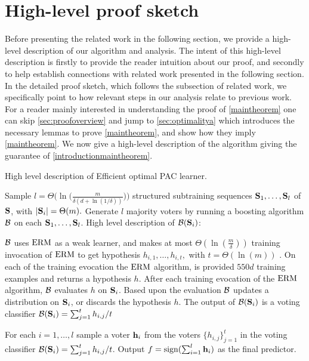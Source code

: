 
\section{High-level proof sketch}
Before presenting the related work in the following section, we provide a high-level description of our algorithm and analysis. The intent of this high-level description is firstly to provide the reader intuition about our proof, and secondly to help establish connections with related work presented in the following section. In the detailed proof sketch, which follows the subsection of related work, we specifically point to how relevant steps in our analysis relate to previous work. For a reader mainly interested in understanding the proof of \cref{maintheorem} one can skip \cref{sec:proofoverview} and jump to \cref{sec:optimalitya} which introduces the necessary lemmas to prove \cref{maintheorem}, and show how they imply \cref{maintheorem}. We now give a high-level description of the algorithm giving the guarantee of \cref{introductionmaintheorem}.

\begin{algorithm}
\caption{High level description of Efficient optimal PAC learner.}\label{alg:algorithmhighlevel}
\begin{algorithmic}[1]
\State Sample $l=\Theta\big(\ln\big(\tfrac{m}{\delta\left(d+\ln{\left(1/\delta \right)}\right)}\big)\big)$ structured subtraining sequences $\mathbf{S}_1, \ldots, \mathbf{S}_{l}$ of $ \mathbf{S} $, with  $ |\mathbf{S}_{i}| =\Theta(m).$ \label{alg:highlevel1}
\State Generate $ l $  majority voters by running a boosting algorithm $\mathcal{B}$ on each $\mathbf{S}_{1},\ldots,\mathbf{S}_{l}$. \quad \quad \quad \quad High level description of $ \mathcal{B}(\mathbf{S}_{i}) $:\label{alg:highlevel2}
\begin{algorithmic}[1]
    \State$ \mathcal{B} $ uses $\mathrm{ERM}$ as a weak learner, and makes at most $\Theta(\ln{\left(\tfrac{m}{\delta} \right)} )$ training invocation of $ \mathrm{ERM} $ to get hypothesis $ h_{i,1},\ldots,h_{i,t},$ with $ t=\Theta(\ln{\left( m\right)}) $ .
    \State On each of the training evocation the $ \mathrm{ERM} $ algorithm, is provided $550d$ training examples and returns a hypothesis $ h $. After each training evocation of the $ \mathrm{ERM} $ algorithm, $ \mathcal{B} $ evaluates $ h$ on $ \mathbf{S}_{i} $. Based upon the evaluation $ \mathcal{B} $  updates a distribution on $ \mathbf{S}_{i}$, or discards the hypothesis $ h.$     
    \State The output of $ \mathcal{B}(\mathbf{S}_{i}) $  is a voting classifier $\mathcal{B}(\mathbf{S}_{i}) = \sum_{j=1}^{t} h_{i,j}/t$
\end{algorithmic}
\State \negmedspace \negmedspace \negmedspace \negmedspace \negmedspace \negmedspace \negmedspace For each $ i=1,\ldots,l $  sample a voter $ \mathbf{h}_i $  from the voters $ \{ h_{i,j} \}_{j=1}^{t} $ in the voting classifier $ \mathcal{B}(\mathbf{S}_{i})=\sum_{j=1}^{t} h_{i,j}/t $. Output $f=\operatorname{sign}(\sum_{i=1}^{l} \mathbf{h}_i) $ as the final predictor.\label{alg:highlevel3}
\end{algorithmic}
\end{algorithm}

